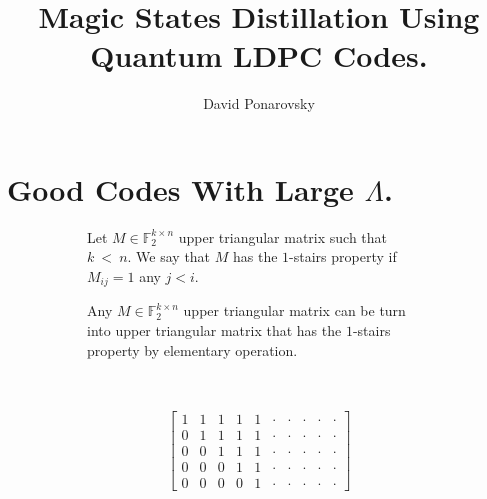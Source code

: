 \documentclass[manuscript,screen,review]{acmart}
\begin{document}

\title{Magic States Distillation Using Quantum LDPC Codes. } 
\author{David Ponarovsky}
\maketitle




%
%

\section{Good Codes With Large $\Lambda$.}
\newcommand*{\DETAILS}{}
\ifdefined\DETAILS
  \begin{figure}[h]
\begin{subfigure}[t]{0.65\textwidth}
\begin{definition}
  Let $M \in \mathbb{F}_{2}^{k \times n }$ upper triangular matrix such that~$k~<~n$. We say that $M$ has the $1$-stairs property if $M_{ij}=1$ any $j<i$. 
\end{definition}
\begin{claim}
  \label{claim:stair}
  Any $M \in \mathbb{F}_{2}^{k \times n }$ upper triangular matrix can be turn into upper triangular matrix that has the $1$-stairs property by elementary operation.  
\end{claim}

\end{subfigure}
\begin{subfigure}[t]{0.05\textwidth}
  \
\end{subfigure}
  \begin{subfigure}[t]{0.25\textwidth}

    \begin{equation*}
      \begin{split}
        \begin{bmatrix}
         1 & 1 & 1 &1 &1 &\cdot & \cdot & \cdot & \cdot & \cdot \\     
         0 & 1 & 1 &1 &1 &\cdot & \cdot & \cdot & \cdot & \cdot \\     
         0 & 0 & 1 &1 &1 &\cdot & \cdot & \cdot & \cdot & \cdot \\     
         0 & 0 & 0 &1 &1 &\cdot & \cdot & \cdot & \cdot & \cdot \\
         0 & 0 & 0 &0 &1 &\cdot & \cdot & \cdot & \cdot & \cdot 
        \end{bmatrix}
      \end{split}
    \end{equation*}

 \end{subfigure}
\end{figure}
\end{document}
